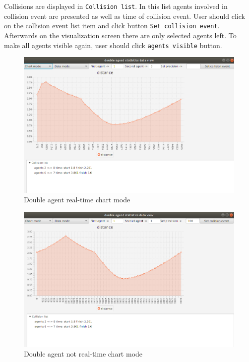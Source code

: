 \documentclass[thesis=B,english]{FITthesis}[2019/12/23]
\begin{document}
Collisions are displayed in \verb|Collision list|. In this list agents involved in collision event are presented as well as time of collision event. User should click on the collision event list item and click button \verb|Set collision event|. Afterwards on the visualization screen there are only selected agents left. To make all agents visible again, user should click \verb|agents visible| button.
\begin{figure}
	\includegraphics[scale=0.34]{onlinechart2.png}
	\caption[Online chart mode2]{Double agent real-time chart mode}\label{fig:float24}
\end{figure}

\begin{figure}
	\includegraphics[scale=0.34]{not-onlinechart2.png}
	\caption[Not Online chart mode2]{Double agent not real-time chart mode}\label{fig:float25}
\end{figure}
\end{document}
